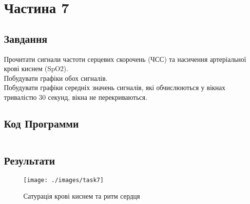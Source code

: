 \section{Частина 7}
\label{sec:task7}

\subsection{Завдання}
\label{subsec:task7_task}

Прочитати сигнали частоти серцевих скорочень (ЧСС)
та насичення артеріальної крові киснем (SpO2). \\
Побудувати графіки обох сигналів. \\
Побудувати графіки середніх значень сигналів,
які обчислюються у вікнах тривалістю 30 секунд, вікна не перекриваються.

\subsection{Код Программи}
\label{subsec:task7_code}
\inputminted{python}{../src/task7.py}

\subsection{Результати}
\label{subsec:task7_results}

\begin{figure}[!ht]
    \centering
    \texttt{[image: ./images/task7]}
    \caption{Сатурація крові киснем та ритм сердця}
    \label{fig:blood_saturation_and_heart_rate}
\end{figure}
